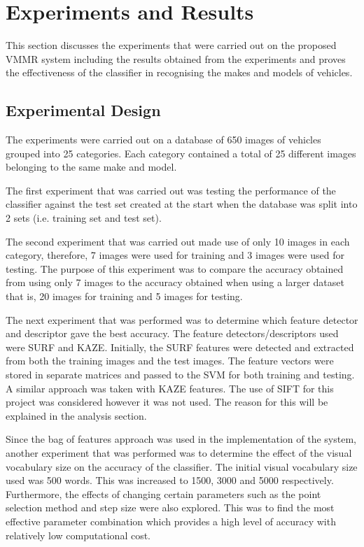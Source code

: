 \documentclass[a4paper, 12pt]{article}
\begin{document}
\newpage 
\section{ Experiments and Results }
This section discusses the experiments that were carried out on the proposed VMMR system including the results obtained from the experiments and proves the effectiveness of the classifier in recognising the makes and models of vehicles. 

\subsection{Experimental Design}
The experiments were carried out on a database of 650 images of vehicles grouped into 25 categories. Each category contained a total of 25 different images belonging to the same make and model.

The first experiment that was carried out was testing the performance of the classifier against the test set created at the start when the database was split into 2 sets (i.e. training set and test set).

The second experiment that was carried out made use of only 10 images in each category, therefore, 7 images were used for training and 3 images were used for testing. The purpose of this experiment was to compare the accuracy obtained from using only 7 images to the accuracy obtained when using a larger dataset that is, 20 images for training and 5 images for testing.  

The next experiment that was performed was to determine which feature detector and descriptor gave the best accuracy. The feature detectors/descriptors used were SURF and KAZE. Initially, the SURF features were detected and extracted from both the training images and the test images. The feature vectors were stored in separate matrices and passed to the SVM for both training and testing. A similar approach was taken with KAZE features. The use of SIFT for this project was considered however it was not used. The reason for this will be explained in the analysis section.

Since the bag of features approach was used in the implementation of the system, another experiment that was performed was to determine the effect of the visual vocabulary size on the accuracy of the classifier. The initial visual vocabulary size used was 500 words. This was increased to 1500, 3000 and 5000 respectively. Furthermore, the effects of changing certain parameters such as the point selection method and step size were also explored. This was to find the most effective parameter combination which provides a high level of accuracy with relatively low computational cost.
\end{document}
